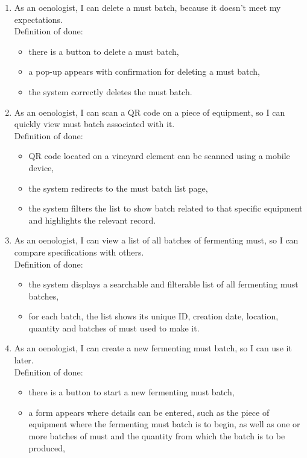 \begin{enumerate}
\begin{itemize}
	\end{itemize}
	\item As an oenologist, I can delete a must batch, because it doesn't meet my expectations.
	\\Definition of done:
	\begin{itemize}
		\item there is a button to delete a must batch,
		\item a pop-up appears with confirmation for deleting a must batch,
		\item the system correctly deletes the must batch.
	\end{itemize}
	\item As an oenologist, I can scan a QR code on a piece of equipment, so I can quickly view must batch associated with it.
	\\Definition of done:
	\begin{itemize}
		\item QR code located on a vineyard element can be scanned using a mobile device,
		\item the system redirects to the must batch list page,
		\item the system filters the list to show batch related to that specific equipment and highlights the relevant record.
	\end{itemize}
	\item As an oenologist, I can view a list of all batches of fermenting must, so I can compare specifications with others.
	\\Definition of done:
	\begin{itemize}
		\item the system displays a searchable and filterable list of all fermenting must batches,
		\item for each batch, the list shows its unique ID, creation date, location, quantity and batches of must used to make it.
	\end{itemize}
	\item As an oenologist, I can create a new fermenting must batch, so I can use it later.
	\\Definition of done:
	\begin{itemize}
		\item there is a button to start a new fermenting must batch,
		\item a form appears where details can be entered, such as the piece of equipment where the fermenting must batch is to begin, as well as one or more batches of must and the quantity from which the batch is to be produced,

\end{itemize}
\end{enumerate}
